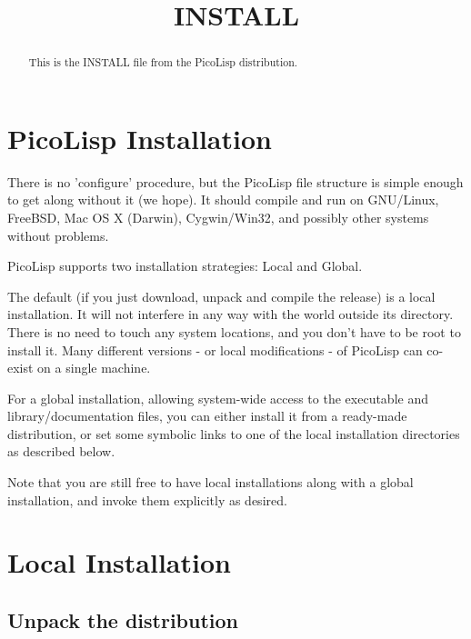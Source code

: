 \title{INSTALL}

\maketitle



\begin{abstract}
This is the INSTALL file from the PicoLisp distribution.   
\end{abstract}


\section{PicoLisp Installation}
\label{sec:install-picolisp-installation}

There is no 'configure' procedure, but the PicoLisp file structure is
simple enough to get along without it (we hope). It should compile and
run on GNU/Linux, FreeBSD, Mac OS X (Darwin), Cygwin/Win32, and
possibly other systems without problems.

PicoLisp supports two installation strategies: Local and Global.

The default (if you just download, unpack and compile the release) is a local
installation. It will not interfere in any way with the world outside its
directory. There is no need to touch any system locations, and you don't have to
be root to install it. Many different versions - or local modifications - of
PicoLisp can co-exist on a single machine.

For a global installation, allowing system-wide access to the executable and
library/documentation files, you can either install it from a ready-made
distribution, or set some symbolic links to one of the local installation
directories as described below.

Note that you are still free to have local installations along with a global
installation, and invoke them explicitly as desired.


\section{Local Installation}
\label{sec:install-local-installation}

\subsection{Unpack the distribution}
\label{sec:install-unpack-the-distribution}

